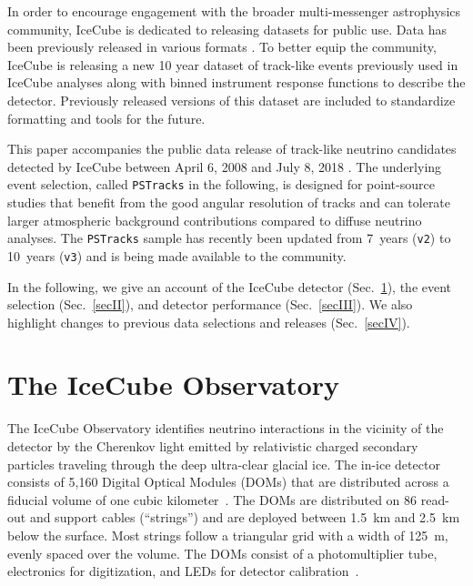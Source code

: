 \documentclass[aps,10pt,prd,twocolumn,floats,letterpaper,showpacs,nofootinbib,bibnotes,notitlepage,superscriptaddress,floatfix]{revtex4-1}
\begin{document}
In order to encourage engagement with the broader multi-messenger astrophysics community, IceCube is dedicated to releasing datasets for public use. Data has been previously released in various formats \cite{IC40data, IceCube:2013hese, IC59data, IceCube:2015numu, IceCube:2015hese4, IceCube:2016ps1, IceCube:2018, IceCube:TXS2018, IceCube:Alerts2018, IceCube:2019, IceCube:2019pst}. To better equip the community, IceCube is releasing a new 10 year dataset of track-like events previously used in IceCube analyses along with binned instrument response functions to describe the detector. Previously released versions of this dataset are included to standardize formatting and tools for the future.

This paper accompanies the public data release of track-like neutrino candidates detected by IceCube between April 6, 2008 and July 8, 2018 \cite{data:IC40IC86VII}. The underlying event selection, called {\tt PSTracks} in the following, is designed for point-source studies that benefit from the good angular resolution of tracks and can tolerate larger atmospheric background contributions compared to diffuse neutrino analyses. The {\tt PSTracks} sample has recently been updated from 7~years ({\tt v2}) to 10~years ({\tt v3}) and is being made available to the community.

In the following, we give an account of the IceCube detector (Sec.~\ref{secI}), the event selection (Sec.~\ref{secII}), and detector performance (Sec.~\ref{secIII}). We also highlight changes to previous data selections and releases (Sec.~\ref{secIV}).

\section{The IceCube Observatory}\label{secI}

The IceCube Observatory identifies neutrino interactions in the vicinity of the detector by the Cherenkov light emitted by relativistic charged secondary particles traveling through the deep ultra-clear glacial ice. The in-ice detector consists of 5,160 Digital Optical Modules (DOMs) that are distributed across a fiducial volume of one cubic kilometer~\cite{Abbasi:2008aa, Abbasi:2010vc}. The DOMs are distributed on 86 read-out and support cables (``strings'') and are deployed between 1.5~km and 2.5~km below the surface. Most strings follow a triangular grid with a width of 125~m, evenly spaced over the volume. The DOMs consist of a photomultiplier tube, electronics for digitization, and LEDs for detector calibration~\cite{Abbasi:2008aa, Abbasi:2010vc}.
\end{document}
